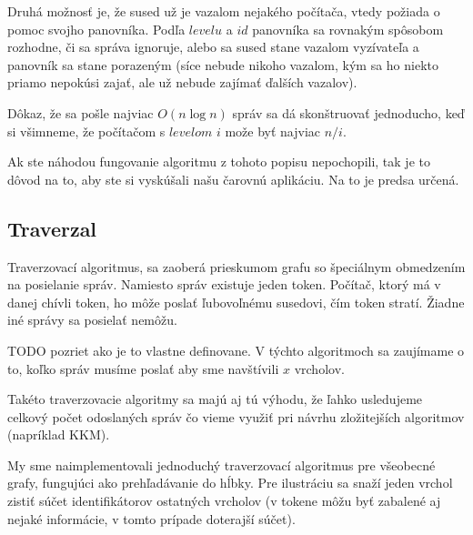 Druhá možnosť je, že sused už je vazalom nejakého počítača, vtedy požiada o pomoc svojho panovníka.
Podľa $levelu$ a $id$ panovníka sa rovnakým spôsobom rozhodne, či sa správa ignoruje, alebo 
sa sused stane vazalom vyzívateľa a panovník sa stane porazeným (síce nebude nikoho vazalom, kým sa
ho niekto priamo nepokúsi zajať, ale už nebude zajímať ďalších vazalov).

Dôkaz, že sa pošle najviac $O(n\log n)$ správ sa dá skonštruovať jednoducho, keď si všimneme, 
že počítačom s $levelom$ $i$ može byť najviac $n/i$.

Ak ste náhodou fungovanie algoritmu z tohoto popisu nepochopili, tak je to dôvod na to, aby ste si vyskúšali našu
čarovnú aplikáciu. Na to je predsa určená.

\subsection{Traverzal}

Traverzovací algoritmus, sa zaoberá prieskumom grafu so špeciálnym obmedzením na posielanie správ.
Namiesto správ existuje jeden token. Počítač, ktorý má v danej chívli token, ho môže poslať ľubovoľnému
susedovi, čím token stratí. Žiadne iné správy sa posielať nemôžu. 

TODO pozriet ako je to vlastne definovane.
V týchto algoritmoch sa zaujímame o to, koľko správ musíme poslať aby sme navštívili $x$ vrcholov.

Takéto traverzovacie algoritmy sa majú aj tú výhodu, že ľahko usledujeme celkový počet odoslaných
správ čo vieme využiť pri návrhu zložitejších algoritmov (napríklad KKM).

My sme naimplementovali jednoduchý traverzovací algoritmus pre všeobecné grafy, fungujúci ako 
prehľadávanie do hĺbky. Pre ilustráciu sa snaží jeden vrchol zistiť súčet identifikátorov ostatných
vrcholov (v tokene môžu byť zabalené aj nejaké informácie, v tomto prípade doterajší súčet).






